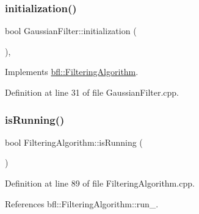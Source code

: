 \mbox{\label{classbfl_1_1GaussianFilter_ac0305fa835af89ba5962ee1211d4d0c0}} 
\subsubsection{\texorpdfstring{initialization()}{initialization()}}
{\footnotesize\ttfamily bool Gaussian\+Filter\+::initialization (\begin{DoxyParamCaption}{ }\end{DoxyParamCaption})\hspace{0.3cm}{\ttfamily [override]}, {\ttfamily [virtual]}}



Implements \mbox{\hyperlink{classbfl_1_1FilteringAlgorithm_adebe2ec2372f97a2a5baecf8c2c2a9c9}{bfl\+::\+Filtering\+Algorithm}}.



Definition at line 31 of file Gaussian\+Filter.\+cpp.

\mbox{\label{classbfl_1_1FilteringAlgorithm_a5cfecab2c778620e2557237472bb1721}} 
\subsubsection{\texorpdfstring{is\+Running()}{isRunning()}}
{\footnotesize\ttfamily bool Filtering\+Algorithm\+::is\+Running (\begin{DoxyParamCaption}{ }\end{DoxyParamCaption})\hspace{0.3cm}{\ttfamily [inherited]}}



Definition at line 89 of file Filtering\+Algorithm.\+cpp.



References bfl\+::\+Filtering\+Algorithm\+::run\+\_\+.

\mbox{\label{classbfl_1_1Logger_ad44f46593cb8c4c87c1178eb326e2f64}} 
